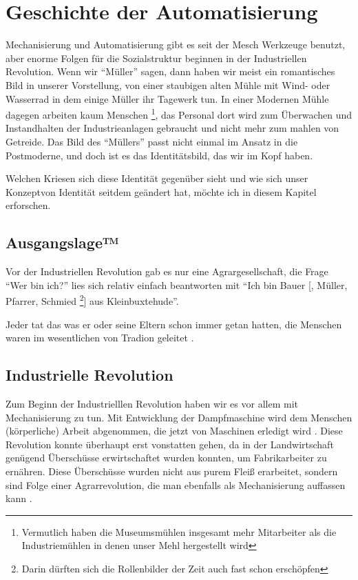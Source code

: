 \section{Geschichte der Automatisierung}

Mechanisierung und Automatisierung gibt es seit der Mesch Werkzeuge benutzt, aber enorme Folgen für die Sozialstruktur beginnen in der Industriellen Revolution.
Wenn wir \enquote{Müller} sagen, dann haben wir meist ein romantisches Bild in unserer Vorstellung, von einer staubigen alten Mühle mit Wind- oder Wasserrad in dem einige Müller ihr Tagewerk tun.
In einer Modernen Mühle dagegen arbeiten kaum Menschen \footnote{Vermutlich haben die Museumsmühlen insgesamt mehr Mitarbeiter als die Industriemühlen in denen unser Mehl hergestellt wird}, das Personal dort wird zum Überwachen und Instandhalten der Industrieanlagen gebraucht und nicht mehr zum mahlen von Getreide.
Das Bild des \enquote{Müllers} passt nicht einmal im Ansatz in die Postmoderne, und doch ist es das Identitätsbild, das wir im Kopf haben.

Welchen Kriesen sich diese Identität gegenüber sieht und wie sich unser Konzeptvon Identität seitdem geändert hat, möchte ich in diesem Kapitel erforschen.

\subsection{Ausgangslage™}

Vor der Industriellen Revolution gab es nur eine Agrargesellschaft, die Frage \enquote{Wer bin ich?} lies sich relativ einfach beantworten mit \enquote{Ich bin Bauer [, Müller, Pfarrer, Schmied \footnote{Darin dürften sich die Rollenbilder der Zeit auch fast schon erschöpfen}] aus Kleinbuxtehude}.

Jeder tat das was er oder seine Eltern schon immer getan hatten, die Menschen waren im wesentlichen von Tradion geleitet \parencite{riessman}.

\subsection{Industrielle Revolution}

Zum Beginn der Industrielllen Revolution haben wir es vor allem mit Mechanisierung zu tun.
Mit Entwicklung der Dampfmaschine wird dem Menschen (körperliche) Arbeit abgenommen, die jetzt von Maschinen erledigt wird \parencite{landes}.
Diese Revolution konnte überhaupt erst vonstatten gehen, da in der Landwirtschaft genügend Überschüsse erwirtschaftet wurden konnten, um Fabrikarbeiter zu ernähren. Diese Überschüsse wurden nicht aus purem Fleiß erarbeitet, sondern sind Folge einer Agrarrevolution, die man ebenfalls als Mechanisierung auffassen kann \parencite{weissenborn, prass}.

